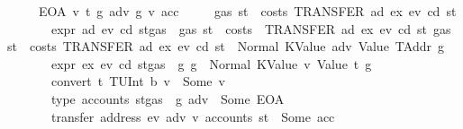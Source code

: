 \begin{isabellebody}
\ \ \ \ {\isacharbar}{\kern0pt}\ {\isacharparenleft}{\kern0pt}EOA{\isacharparenright}{\kern0pt}\ v\ t\ g\ adv\ g{\isacharprime}{\kern0pt}\ v{\isacharprime}{\kern0pt}\ acc\isanewline
\ \ \ \ \ {\isachardoublequoteopen}gas\ st\ {\isachargreater}{\kern0pt}\ costs\ {\isacharparenleft}{\kern0pt}TRANSFER\ ad\ ex{\isacharparenright}{\kern0pt}\ ev\ cd\ st{\isachardoublequoteclose}\isanewline
\ \ \ \ \ \ \ {\isachardoublequoteopen}expr\ ad\ ev\ cd\ {\isacharparenleft}{\kern0pt}st{\isasymlparr}gas\ {\isacharcolon}{\kern0pt}{\isacharequal}{\kern0pt}\ gas\ st\ {\isacharminus}{\kern0pt}\ costs\ \ {\isacharparenleft}{\kern0pt}TRANSFER\ ad\ ex{\isacharparenright}{\kern0pt}\ ev\ cd\ st{\isasymrparr}{\isacharparenright}{\kern0pt}\ {\isacharparenleft}{\kern0pt}gas\ st\ {\isacharminus}{\kern0pt}\ costs\ {\isacharparenleft}{\kern0pt}TRANSFER\ ad\ ex{\isacharparenright}{\kern0pt}\ ev\ cd\ st{\isacharparenright}{\kern0pt}\ {\isacharequal}{\kern0pt}\ Normal\ {\isacharparenleft}{\kern0pt}{\isacharparenleft}{\kern0pt}KValue\ adv{\isacharcomma}{\kern0pt}\ Value\ TAddr{\isacharparenright}{\kern0pt}{\isacharcomma}{\kern0pt}\ g{\isacharparenright}{\kern0pt}{\isachardoublequoteclose}\isanewline
\ \ \ \ \ \ \ {\isachardoublequoteopen}expr\ ex\ ev\ cd\ {\isacharparenleft}{\kern0pt}st{\isasymlparr}gas\ {\isacharcolon}{\kern0pt}{\isacharequal}{\kern0pt}\ g{\isasymrparr}{\isacharparenright}{\kern0pt}\ g\ {\isacharequal}{\kern0pt}\ Normal\ {\isacharparenleft}{\kern0pt}{\isacharparenleft}{\kern0pt}KValue\ v{\isacharcomma}{\kern0pt}\ Value\ t{\isacharparenright}{\kern0pt}{\isacharcomma}{\kern0pt}\ g{\isacharprime}{\kern0pt}{\isacharparenright}{\kern0pt}{\isachardoublequoteclose}\isanewline
\ \ \ \ \ \ \ {\isachardoublequoteopen}convert\ t\ {\isacharparenleft}{\kern0pt}TUInt\ b{}{}{}{\isacharparenright}{\kern0pt}\ v\ {\isacharequal}{\kern0pt}\ Some\ v{\isacharprime}{\kern0pt}{\isachardoublequoteclose}\isanewline
\ \ \ \ \ \ \ {\isachardoublequoteopen}type\ {\isacharparenleft}{\kern0pt}accounts\ {\isacharparenleft}{\kern0pt}st{\isasymlparr}gas\ {\isacharcolon}{\kern0pt}{\isacharequal}{\kern0pt}\ g{\isasymrparr}{\isacharparenright}{\kern0pt}\ adv{\isacharparenright}{\kern0pt}\ {\isacharequal}{\kern0pt}\ Some\ EOA{\isachardoublequoteclose}\isanewline
\ \ \ \ \ \ \ {\isachardoublequoteopen}transfer\ {\isacharparenleft}{\kern0pt}address\ ev{\isacharparenright}{\kern0pt}\ adv\ v{\isacharprime}{\kern0pt}\ {\isacharparenleft}{\kern0pt}accounts\ st{\isacharparenright}{\kern0pt}\ {\isacharequal}{\kern0pt}\ Some\ acc{\isachardoublequoteclose}\isanewline

\end{isabellebody}
